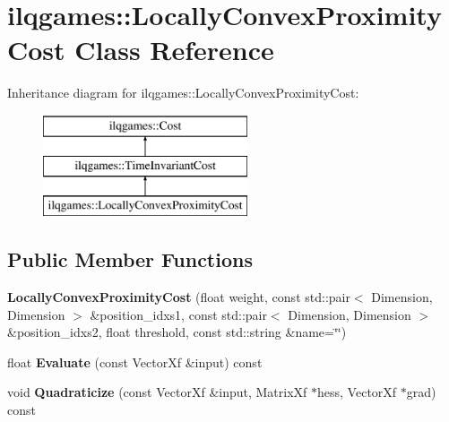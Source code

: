 \hypertarget{classilqgames_1_1_locally_convex_proximity_cost}{}\section{ilqgames\+:\+:Locally\+Convex\+Proximity\+Cost Class Reference}
\label{classilqgames_1_1_locally_convex_proximity_cost}
Inheritance diagram for ilqgames\+:\+:Locally\+Convex\+Proximity\+Cost\+:\begin{figure}[H]
\begin{center}
\leavevmode
\includegraphics[height=3.000000cm]{classilqgames_1_1_locally_convex_proximity_cost}
\end{center}
\end{figure}
\subsection*{Public Member Functions}
\begin{DoxyCompactItemize}
\item 
{\bfseries Locally\+Convex\+Proximity\+Cost} (float weight, const std\+::pair$<$ Dimension, Dimension $>$ \&position\+\_\+idxs1, const std\+::pair$<$ Dimension, Dimension $>$ \&position\+\_\+idxs2, float threshold, const std\+::string \&name=\char`\"{}\char`\"{})\hypertarget{classilqgames_1_1_locally_convex_proximity_cost_aabea3cea381b56639bcb4e60df93ee48}{}\label{classilqgames_1_1_locally_convex_proximity_cost_aabea3cea381b56639bcb4e60df93ee48}

\item 
float {\bfseries Evaluate} (const Vector\+Xf \&input) const \hypertarget{classilqgames_1_1_locally_convex_proximity_cost_ae0f309dfa69dc2c46158afda394af9e3}{}\label{classilqgames_1_1_locally_convex_proximity_cost_ae0f309dfa69dc2c46158afda394af9e3}

\item 
void {\bfseries Quadraticize} (const Vector\+Xf \&input, Matrix\+Xf $\ast$hess, Vector\+Xf $\ast$grad) const \hypertarget{classilqgames_1_1_locally_convex_proximity_cost_adf826e1e1063bad897a5dcce3c3bc44c}{}\label{classilqgames_1_1_locally_convex_proximity_cost_adf826e1e1063bad897a5dcce3c3bc44c}

\end{DoxyCompactItemize}
